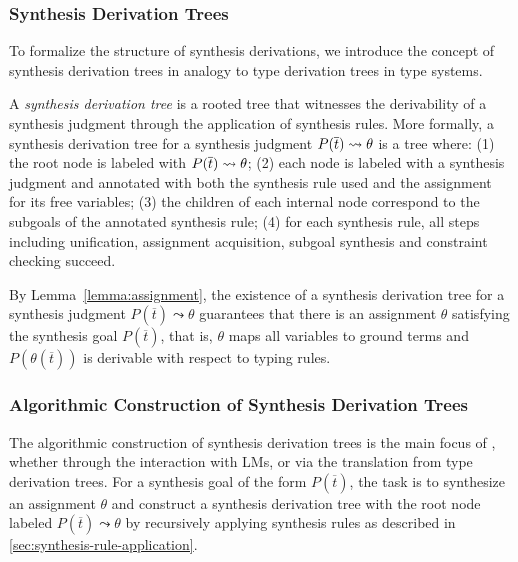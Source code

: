 \subsubsection{Synthesis Derivation Trees}
\label{sec:synthesis-derivation-tree}
To formalize the structure of synthesis derivations, we introduce the concept of synthesis derivation trees in analogy to type derivation trees in type systems. 

A \emph{synthesis derivation tree} is a rooted tree that witnesses the derivability of a synthesis judgment through the application of synthesis rules. More formally, a synthesis derivation tree for a synthesis judgment $P(\overline{t}) \leadsto \theta$ is a tree where: (1) the root node is labeled with $P(\overline{t}) \leadsto \theta$; (2) each node is labeled with a synthesis judgment and annotated with both the synthesis rule used and the assignment for its free variables; (3) the children of each internal node correspond to the subgoals of the annotated synthesis rule; (4) for each synthesis rule, all steps including unification, assignment acquisition, subgoal synthesis and constraint checking succeed.

By Lemma~\ref{lemma:assignment}, the existence of a synthesis derivation tree for a synthesis judgment $P(\overline{t}) \leadsto \theta$ guarantees that there is an assignment $\theta$ satisfying the synthesis goal $P(\overline{t})$, that is, $\theta$ maps all variables to ground terms and $P(\theta(\overline{t}))$ is derivable with respect to typing rules.

\subsubsection{Algorithmic Construction of Synthesis Derivation Trees}
\label{sec:synthtree-construction-query}
The algorithmic construction of synthesis derivation trees is the main focus of \mainname, whether through the interaction with LMs, or via the translation from type derivation trees.
For a synthesis goal of the form $P(\overline{t})$, the task is to synthesize an assignment $\theta$ and construct a synthesis derivation tree with the root node labeled $P(\overline{t}) \leadsto \theta$ by recursively applying synthesis rules as described in \autoref{sec:synthesis-rule-application}.

